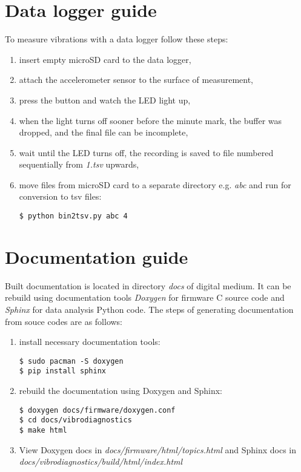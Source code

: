 \section{Data logger guide}
To measure vibrations with a data logger follow these steps:

\begin{enumerate}[noitemsep]
\item insert empty microSD card to the data logger,
\item attach the accelerometer sensor to the surface of measurement,
\item press the button and watch the LED light up,
\item when the light turns off sooner before the minute mark, the buffer was dropped, and the final file can be incomplete,
\item wait until the LED turns off, the recording is saved to file numbered sequentially from \emph{1.tsv} upwards,
\item {move files from microSD card to a separate directory e.g. \emph{abc} and run for conversion to tsv files:
\begin{lstlisting}[style=messages]
$ python bin2tsv.py abc 4
\end{lstlisting}}
\end{enumerate}


\section{Documentation guide}
Built documentation is located in directory \emph{docs} of digital medium. It can be rebuild using documentation tools \emph{Doxygen} for firmware C source code and \emph{Sphinx} for data analysis Python code. The steps of generating documentation from souce codes are as follows:

\begin{enumerate}[noitemsep]
\item {install necessary documentation tools:
\begin{lstlisting}[style=messages]
$ sudo pacman -S doxygen
$ pip install sphinx
\end{lstlisting}}
\item {rebuild the documentation using Doxygen and Sphinx:
\begin{lstlisting}[style=messages]
$ doxygen docs/firmware/doxygen.conf
$ cd docs/vibrodiagnostics
$ make html
\end{lstlisting}}
\item {View Doxygen docs in \emph{docs/firmware/html/topics.html} and Sphinx docs in \emph{docs/vibrodiagnostics/build/html/index.html}}
\end{enumerate}
